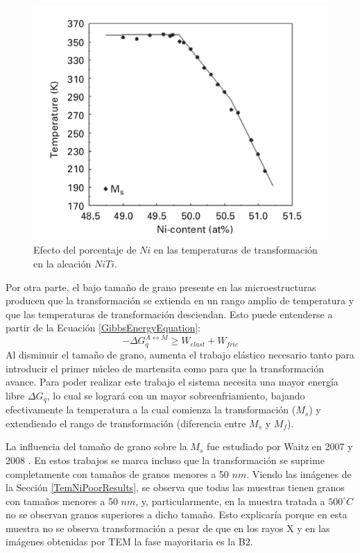 \documentclass[12pt]{article}
\theoremstyle{definition}
\theoremstyle{remark}
\begin{document}
\begin{figure}[H]
 	\centering
	\includegraphics[scale=0.7]{img/MsNiDependence.png}
 	\caption{Efecto del porcentaje de $Ni$ en las temperaturas de transformación en la aleación $NiTi$.}
	\label{NiDependence}
\end{figure}


Por otra parte, el bajo tamaño de grano presente en las microestructuras producen que la transformación se extienda en un rango amplio de temperatura y que las temperaturas de transformación desciendan. Esto puede entenderse a partir de la Ecuación \ref{GibbsEnergyEquation}:
\begin{equation*}
	- \Delta G_{q}^{A \leftrightarrow M} \geq W_{elast} + W_{fric}
\end{equation*} 
Al disminuir el tamaño de grano, aumenta el trabajo elástico necesario tanto para introducir el primer núcleo de martensita como para que la transformación avance. Para poder realizar este trabajo el sistema necesita una mayor energía libre $\Delta G_{q}$, lo cual se logrará con un mayor sobreenfriamiento, bajando efectivamente la temperatura a la cual comienza la transformación ($M_s$) y extendiendo el rango de transformación (diferencia entre $M_s$ y $M_f$).

La influencia del tamaño de grano sobre la $M_s$ fue estudiado por Waitz en 2007 y 2008 \citep{Waitz2007}\citep{Waitz2008}. En estos trabajos se marca incluso que la transformación se suprime completamente con tamaños de granos menores a 50 $nm$. Viendo las imágenes de la Sección \ref{TemNiPoorResults}, se observa que todas las muestras tienen granos con tamaños menores a 50 $nm$, y, particularmente, en la muestra tratada a $500^\circ C$ no se observan granos superiores a dicho tamaño. Esto explicaría porque en esta muestra no se observa transformación a pesar de que en los rayos X y en las imágenes obtenidas por TEM la fase mayoritaria es la B2.
\end{document}
